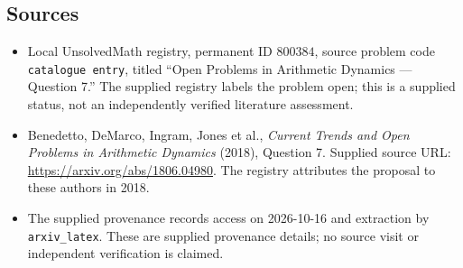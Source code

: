 \documentclass[11pt]{article}
\begin{document}
\subsection{Sources}
\begin{itemize}
\item Local UnsolvedMath registry, permanent ID \(800384\), source problem code \texttt{catalogue entry}, titled ``Open Problems in Arithmetic Dynamics --- Question 7.'' The supplied registry labels the problem open; this is a supplied status, not an independently verified literature assessment.
\item Benedetto, DeMarco, Ingram, Jones et al., \emph{Current Trends and Open Problems in Arithmetic Dynamics} (2018), Question 7. Supplied source URL: \url{https://arxiv.org/abs/1806.04980}. The registry attributes the proposal to these authors in 2018.
\item The supplied provenance records access on 2026-10-16 and extraction by \texttt{arxiv\_latex}. These are supplied provenance details; no source visit or independent verification is claimed.
\end{itemize}
\end{document}
